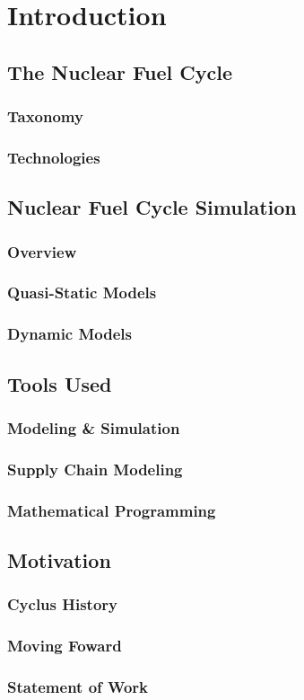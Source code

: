 \chapter{Introduction}\label{ch:intro}

\section{The Nuclear Fuel Cycle}

\subsection{Taxonomy}

\subsection{Technologies}

\section{Nuclear Fuel Cycle Simulation}

\subsection{Overview}

\subsection{Quasi-Static Models}

\subsection{Dynamic Models}

\section{Tools Used}

\subsection{Modeling \& Simulation}

\subsection{Supply Chain Modeling}

\subsection{Mathematical Programming}

\section{Motivation}

\subsection{Cyclus History}

\subsection{Moving Foward}

\subsection{Statement of Work}
